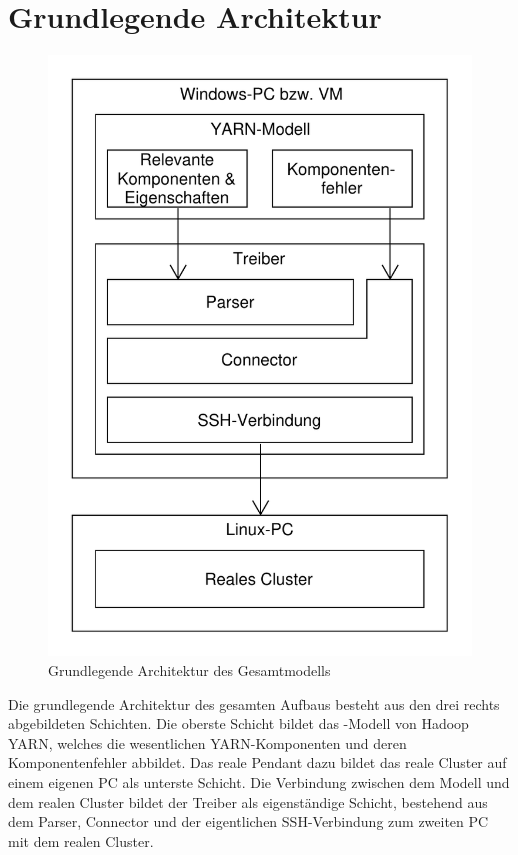 \section{Grundlegende Architektur}\label{sec:architecture}

\begin{figure}
	\centering
	\includegraphics[width=0.5\columnwidth]{./images/modelArchitecture.pdf}
	\caption{Grundlegende Architektur des Gesamtmodells}
	\label{fig:modelArchitecture}
\end{figure}

Die grundlegende Architektur des gesamten Aufbaus besteht aus den drei rechts abgebildeten Schichten. Die oberste Schicht bildet das \sS-Modell von Hadoop YARN, welches die wesentlichen YARN-Komponenten und deren Komponentenfehler abbildet. Das reale Pendant dazu bildet das reale Cluster auf einem eigenen PC als unterste Schicht. Die Verbindung zwischen dem Modell und dem realen Cluster bildet der Treiber als eigenständige Schicht, bestehend aus dem Parser, Connector und der eigentlichen SSH-Verbindung zum zweiten PC mit dem realen Cluster.